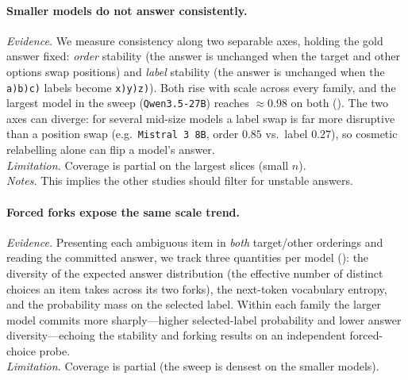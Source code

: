 \paragraph{Smaller models do not answer consistently.}
\textit{Evidence.} We measure consistency along two separable axes, holding the gold
answer fixed: \emph{order} stability (the answer is unchanged when the target and other
options swap positions) and \emph{label} stability (the answer is unchanged when the
\texttt{a)b)c)} labels become \texttt{x)y)z)}). Both rise with scale across every
family, and the largest model in the sweep (\texttt{Qwen3.5-27B}) reaches
${\approx}0.98$ on both (). The two axes can diverge: for several
mid-size models a label swap is far more disruptive than a position swap (e.g.\
\texttt{Mistral 3 8B}, order $0.85$ vs.\ label $0.27$), so cosmetic relabelling alone can
flip a model's answer.\\
\textit{Limitation.} Coverage is partial on the largest slices (small $n$).\\
\textit{Notes.} This implies the other studies should filter for unstable answers.


\paragraph{Forced forks expose the same scale trend.}
\textit{Evidence.} Presenting each ambiguous item in \emph{both} target/other orderings and
reading the committed answer, we track three quantities per model
(\Cref{fig:forced-fork}): the diversity of the expected answer distribution (the effective
number of distinct choices an item takes across its two forks), the next-token vocabulary
entropy, and the probability mass on the selected label. Within each family the larger model
commits more sharply---higher selected-label probability and lower answer diversity---echoing
the stability and forking results on an independent forced-choice probe.\\
\textit{Limitation.} Coverage is partial (the sweep is densest on the smaller models).


